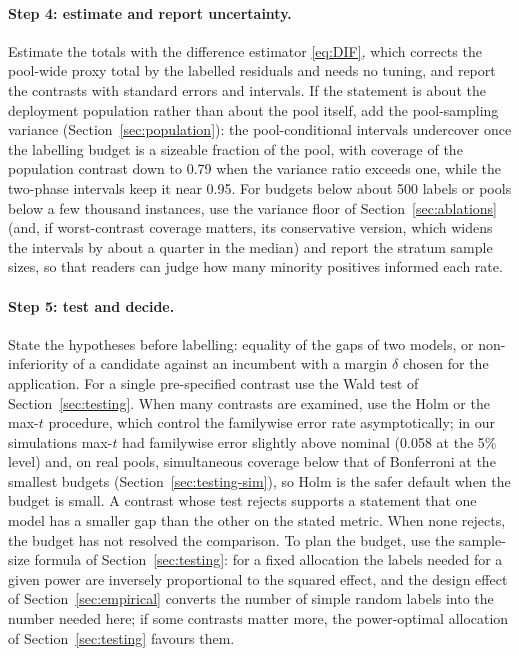 \paragraph{Step 4: estimate and report uncertainty.} Estimate the totals with the difference estimator \eqref{eq:DIF}, which corrects the pool-wide proxy total by the labelled residuals and needs no tuning, and report the contrasts with standard errors and intervals. If the statement is about the deployment population rather than about the pool itself, add the pool-sampling variance (Section~\ref{sec:population}): the pool-conditional intervals undercover once the labelling budget is a sizeable fraction of the pool, with coverage of the population contrast down to 0.79 when the variance ratio exceeds one, while the two-phase intervals keep it near 0.95. For budgets below about 500 labels or pools below a few thousand instances, use the variance floor of Section~\ref{sec:ablations} (and, if worst-contrast coverage matters, its conservative version, which widens the intervals by about a quarter in the median) and report the stratum sample sizes, so that readers can judge how many minority positives informed each rate.

\paragraph{Step 5: test and decide.} State the hypotheses before labelling: equality of the gaps of two models, or non-inferiority of a candidate against an incumbent with a margin $\delta$ chosen for the application. For a single pre-specified contrast use the Wald test of Section~\ref{sec:testing}. When many contrasts are examined, use the Holm or the max-$t$ procedure, which control the familywise error rate asymptotically; in our simulations max-$t$ had familywise error slightly above nominal (0.058 at the 5\% level) and, on real pools, simultaneous coverage below that of Bonferroni at the smallest budgets (Section~\ref{sec:testing-sim}), so Holm is the safer default when the budget is small. A contrast whose test rejects supports a statement that one model has a smaller gap than the other on the stated metric. When none rejects, the budget has not resolved the comparison. To plan the budget, use the sample-size formula of Section~\ref{sec:testing}: for a fixed allocation the labels needed for a given power are inversely proportional to the squared effect, and the design effect of Section~\ref{sec:empirical} converts the number of simple random labels into the number needed here; if some contrasts matter more, the power-optimal allocation of Section~\ref{sec:testing} favours them.

